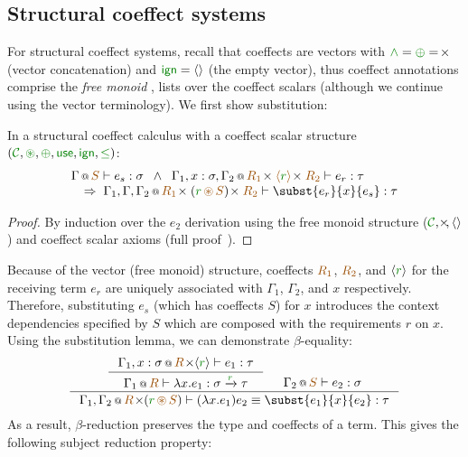 \subsection{Structural coeffect systems}
\label{prop:structural}

For structural coeffect systems, recall that coeffects are vectors
with $\czip = \cpar = \cons$ (vector concatenation) and $\czero =
\langle{}\rangle$ (the empty vector), thus coeffect annotations
comprise the \emph{free monoid} \ie, lists over the coeffect scalars
(although we continue using the vector terminology). We first show
substitution:

\begin{lemma} 
\label{thm:structural-subst}
In a structural coeffect calculus with a coeffect scalar structure $(\C, \cseq, \cpar, \cunit, \czero, \cleq)$: 
\[
\begin{array}{l}
\coctx{\Gamma}{\aclrd{S}} \vdash e_s : \sigma  
\;\;  \wedge  \;\; \coctx{\Gamma_1,  x : \sigma, \Gamma_2}{\aclrd{R_1} \cons\; \alift{\cclrd{r}} \cons\; \aclrd{R_2} } \vdash e_r : \tau\\
\quad \Rightarrow \; \coctx{\Gamma_1,\Gamma,\Gamma_2}{\aclrd{R_1} \cons\; (\cclrd{r} \,\aseq\, \aclrd{S}) \cons\; \aclrd{R_2}} \vdash \subst{e_r}{x}{e_s} : \tau
\end{array}
\]
\vspace{-1.5em}
\label{lemm:structural-subst}
\end{lemma}
\begin{proof}
By induction over the $e_2$ derivation using the free monoid structure ($\C, \cons, \langle{}\rangle$)
and coeffect scalar axioms (full proof~\cite{appendix}). %
\end{proof}

\noindent
Because of the vector (free monoid) structure, coeffects $\aclrd{R_1}$, $\aclrd{R_2}$, and 
$\langle{\cclrd{r}}\rangle$ for the receiving term $e_r$ are uniquely associated with $\Gamma_1$, $\Gamma_2$, and
$x$ respectively. Therefore, substituting $e_s$ (which has coeffects $S$) for $x$ introduces
the context dependencies specified by $S$ which are composed with the requirements $r$ on $x$. 
Using the substitution lemma, we can demonstrate $\beta$-equality:
%
\begin{equation*}
\inference{
  \inference{\coctx{\Gamma_1, x : \sigma}{\aclrd{R} \cons \langle{\cclrd{r}}\rangle} \vdash e_1 : \tau}
             {\coctx{\Gamma_1}{\aclrd{R}} \vdash \lambda x . e_1 : \sigma \xrightarrow{\cclrd{r}} \tau} &
           \coctx{\Gamma_2}{\aclrd{S}} \vdash e_2 : \sigma}
  {\coctx{\Gamma_1,\Gamma_2}{\aclrd{R} \cons (\cclrd{r} \,\aseq\, \aclrd{S})} \vdash (\lambda x . e_1) e_2 
\equiv
\subst{e_1}{x}{e_2} : \tau}
\end{equation*}
\noindent
As a result, $\beta$-reduction preserves the type and coeffects of a term.
This gives the following subject reduction property:


